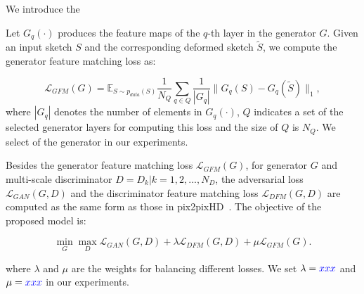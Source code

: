 
We introduce the 

Let $G_q(\cdot)$ produces the feature maps of the $q$-th layer in the generator $G$.
%
Given an input sketch $S$ and the corresponding deformed sketch $\tilde{S}$, we compute the generator feature matching loss as:

\begin{equation}
	\label{eqn:loss_GFM}
	\mathcal{L}_{GFM}(G)=\mathbb{E}_{S\sim p_{data}(S)} \frac{1}{N_Q} \sum_{q\in Q}  \frac{1}{|G_q|} \|G_q(S)-G_q(\tilde{S}) \|_1,
\end{equation}
%
where $|G_q|$ denotes the number of elements in $G_q(\cdot)$, $Q$ indicates a set of the selected generator layers for computing this loss and the size of $Q$ is $N_Q$. 
We select  of the generator in our experiments.

Besides the generator feature matching loss $\mathcal{L}_{GFM}(G)$, for generator $G$ and multi-scale discriminator $D={D_k | k=1,2,...,N_D}$, the adversarial loss $\mathcal{L}_{GAN}(G, D)$ and the discriminator feature matching loss $\mathcal{L}_{DFM}(G, D)$ are computed as the same form as those in pix2pixHD~\cite{pix2pixHD}. 
%
The objective of the proposed model is:

\begin{equation}
	\label{eqn:new_minmax_game}
	\min_G \max_{D} \mathcal{L}_{GAN}(G, D)+\lambda \mathcal{L}_{DFM}(G, D) +\mu \mathcal{L}_{GFM}(G).
\end{equation}

where $\lambda$ and $\mu$ are the weights for balancing different losses. We set $\lambda=\textcolor{blue}{xxx}$ and $\mu=\textcolor{blue}{xxx}$ in our experiments.